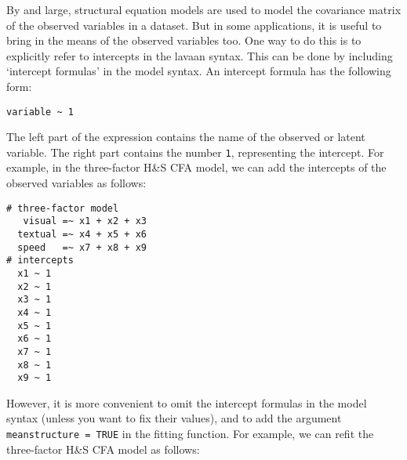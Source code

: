 By and large, structural equation models are used to model the
covariance matrix of the observed variables in a dataset. But in some
applications, it is useful to bring in the means of the observed
variables too. One way to do this is to explicitly refer to intercepts
in the lavaan syntax. This can be done by including `intercept formulas'
in the model syntax. An intercept formula has the following form:

\begin{verbatim}
variable ~ 1
\end{verbatim}

The left part of the expression contains the name of the observed or
latent variable. The right part contains the number \texttt{1},
representing the intercept. For example, in the three-factor H\&S CFA
model, we can add the intercepts of the observed variables as follows:

\begin{verbatim}
# three-factor model
   visual =~ x1 + x2 + x3
  textual =~ x4 + x5 + x6
  speed   =~ x7 + x8 + x9
# intercepts
  x1 ~ 1
  x2 ~ 1
  x3 ~ 1
  x4 ~ 1
  x5 ~ 1
  x6 ~ 1
  x7 ~ 1
  x8 ~ 1
  x9 ~ 1
\end{verbatim}

However, it is more convenient to omit the intercept formulas in the
model syntax (unless you want to fix their values), and to add the
argument \texttt{meanstructure\ =\ TRUE} in the fitting function. For
example, we can refit the three-factor H\&S CFA model as follows:

\begin{Shaded}
\begin{Highlighting}[]
\StringTok{ }
            \NormalTok{)}
\end{Highlighting}
\end{Shaded}

